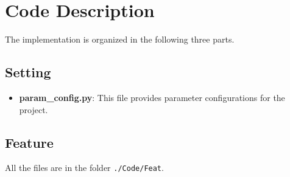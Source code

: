 \documentclass[12pt]{article}
\begin{document}
\section{Code Description}
The implementation is organized in the following three parts.

\subsection{Setting}
\begin{itemize}
\item \textbf{param\_config.py}: This file provides parameter configurations for the project.
\end{itemize}

\subsection{Feature}
All the files are in the folder \texttt{./Code/Feat}.
\end{document}
